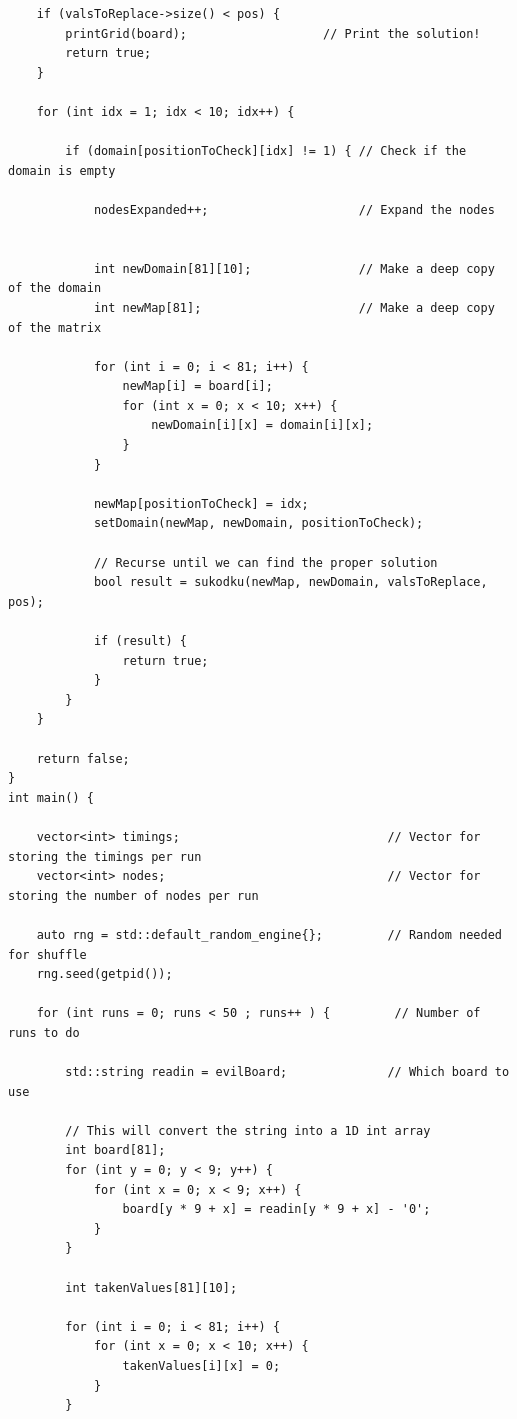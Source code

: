 \documentclass{article}
\begin{document}
\begin{titlepage}
\begin{lstlisting}
    if (valsToReplace->size() < pos) {
        printGrid(board);                   // Print the solution!
        return true;
    }

    for (int idx = 1; idx < 10; idx++) {

        if (domain[positionToCheck][idx] != 1) { // Check if the domain is empty

            nodesExpanded++;                     // Expand the nodes


            int newDomain[81][10];               // Make a deep copy of the domain
            int newMap[81];                      // Make a deep copy of the matrix

            for (int i = 0; i < 81; i++) {
                newMap[i] = board[i];
                for (int x = 0; x < 10; x++) {
                    newDomain[i][x] = domain[i][x];
                }
            }

            newMap[positionToCheck] = idx;
            setDomain(newMap, newDomain, positionToCheck);

            // Recurse until we can find the proper solution
            bool result = sukodku(newMap, newDomain, valsToReplace, pos);

            if (result) {
                return true;
            }
        }
    }

    return false;
}
int main() {

    vector<int> timings;                             // Vector for storing the timings per run
    vector<int> nodes;                               // Vector for storing the number of nodes per run

    auto rng = std::default_random_engine{};         // Random needed for shuffle
    rng.seed(getpid());

    for (int runs = 0; runs < 50 ; runs++ ) {         // Number of runs to do

        std::string readin = evilBoard;              // Which board to use

        // This will convert the string into a 1D int array
        int board[81];
        for (int y = 0; y < 9; y++) {
            for (int x = 0; x < 9; x++) {
                board[y * 9 + x] = readin[y * 9 + x] - '0';
            }
        }

        int takenValues[81][10];

        for (int i = 0; i < 81; i++) {
            for (int x = 0; x < 10; x++) {
                takenValues[i][x] = 0;
            }
        }


\end{lstlisting}
\end{titlepage}
\end{document}
